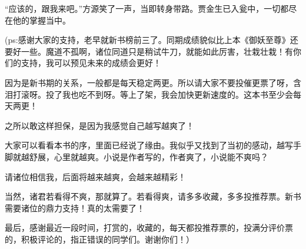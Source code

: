 \begin{this_body}
“应该的，跟我来吧。”方源笑了一声，当即转身带路。贾金生已入瓮中，一切都尽在他的掌握当中。

(ps:感谢大家的支持，老早就新书榜前三了。同期成绩貌似比上本《御妖至尊》还要好一些。魔道不孤啊，诸位同道只是稍试牛刀，就能如此厉害，壮栽壮栽！有你们的支持，我可以预见未来的成绩会更好！

因为是新书期的关系，一般都是每天稳定两更。所以请大家不要投催更票了呀，含泪打滚呀。投了我也吃不到呀。等上了架，我会加快更新速度的。这本书至少会每天两更！

之所以敢这样担保，是因为我感觉自己越写越爽了！

大家可以看看本书的序，里面已经说了缘由。我似乎又找到了当初的感动，越写手脚就越舒展，心里就越爽。小说是作者写的，作者爽了，小说能不爽吗？

请诸位相信我，后面将越来越爽，会越来越精彩！

当然，诸君若看得不爽，那就算了。若看得爽，请多多收藏，多多投推荐票。新书需要诸位的鼎力支持！真的太需要了！

最后，感谢最近一段时间，打赏的，收藏的，每天都投推荐票的，投满分评价票的，积极评论的，指正错误的同学们。谢谢你们！）

\end{this_body}

